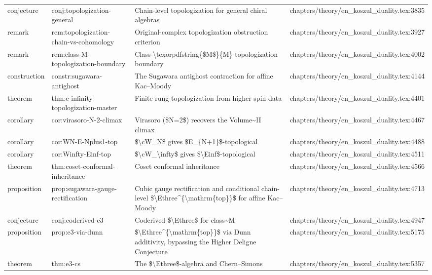 \documentclass[11pt]{article}
\begin{document}
\begin{longtable}{L{0.10\textwidth}L{0.26\textwidth}L{0.42\textwidth}L{0.22\textwidth}}
conjecture & conj:topologization-general & Chain-level topologization for general chiral algebras & chapters/theory/en\_koszul\_duality.tex:3835\\
remark & rem:topologization-chain-vs-cohomology & Original-complex topologization obstruction criterion & chapters/theory/en\_koszul\_duality.tex:3927\\
remark & rem:class-M-topologization-boundary & Class-\textbackslash{}texorpdfstring\{\$M\$\}\{M\} topologization boundary & chapters/theory/en\_koszul\_duality.tex:4002\\
construction & constr:sugawara-antighost & The Sugawara antighost contraction for affine Kac--Moody & chapters/theory/en\_koszul\_duality.tex:4144\\
theorem & thm:e-infinity-topologization-master & Finite-rung topologization from higher-spin data & chapters/theory/en\_koszul\_duality.tex:4401\\
corollary & cor:virasoro-N-2-climax & Virasoro (\$N=2\$) recovers the Volume\textasciitilde{}II climax & chapters/theory/en\_koszul\_duality.tex:4467\\
corollary & cor:WN-E-Nplus1-top & \$\textbackslash{}cW\_N\$ gives \$E\_\{N+1\}\$-topological & chapters/theory/en\_koszul\_duality.tex:4488\\
corollary & cor:Winfty-Einf-top & \$\textbackslash{}cW\_\textbackslash{}infty\$ gives \$\textbackslash{}Einf\$-topological & chapters/theory/en\_koszul\_duality.tex:4511\\
theorem & thm:coset-conformal-inheritance & Coset conformal inheritance & chapters/theory/en\_koszul\_duality.tex:4566\\
proposition & prop:sugawara-gauge-rectification & Cubic gauge rectification and cond{}itional chain-level \$\textbackslash{}Ethree\textasciicircum{}\{\textbackslash{}mathrm\{top\}\}\$ for affine Kac--Moody & chapters/theory/en\_koszul\_duality.tex:4713\\
conjecture & conj:coderived-e3 & Coderived \$\textbackslash{}Ethree\$ for class\textasciitilde{}M & chapters/theory/en\_koszul\_duality.tex:4947\\
proposition & prop:e3-via-dunn & \$\textbackslash{}Ethree\textasciicircum{}\{\textbackslash{}mathrm\{top\}\}\$ via Dunn additivity, bypassing the Higher Deligne Conjecture & chapters/theory/en\_koszul\_duality.tex:5175\\
theorem & thm:e3-cs & The \$\textbackslash{}Ethree\$-algebra and Chern--Simons & chapters/theory/en\_koszul\_duality.tex:5357\\

\end{longtable}
\end{document}
